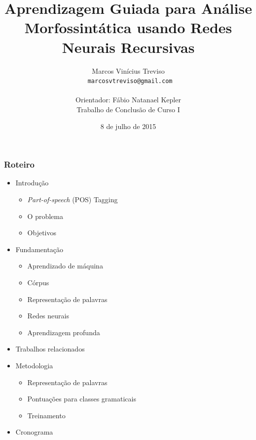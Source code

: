 \documentclass[10pt]{beamer}
\title{Aprendizagem Guiada para Análise Morfossintática usando Redes Neurais Recursivas}
\subtitle{}
\date{8 de julho de 2015}
\author[Treviso]{Marcos Vinícius Treviso\\\scriptsize\texttt{ marcosvtreviso@gmail.com}\\\\Orientador: Fábio Natanael Kepler\\\tiny{Trabalho de Conclusão de Curso I}\\}
\institute{Universidade Federal do Pampa}
\begin{document}
\maketitle


\begin{frame}
  \frametitle{Roteiro}


  \begin{itemize}


    \item Introdução
    
    \begin{itemize}
      \item[\ ] \textit{Part-of-speech} (POS) Tagging 
      \item[\ ] O problema
      \item[\ ] Objetivos
    \end{itemize}


    \item Fundamentação

    \begin{itemize}
      \item[\ ] Aprendizado de máquina
      \item[\ ] Córpus
      \item[\ ] Representação de palavras
      \item[\ ] Redes neurais
      \item[\ ] Aprendizagem profunda
    \end{itemize}


    \item Trabalhos relacionados

    \item Metodologia

    \begin{itemize}
      \item[\ ] Representação de palavras
      \item[\ ] Pontuações para classes gramaticais
      \item[\ ] Treinamento
    \end{itemize}


    \item Cronograma

  \end{itemize}

\end{frame}
\end{document}
